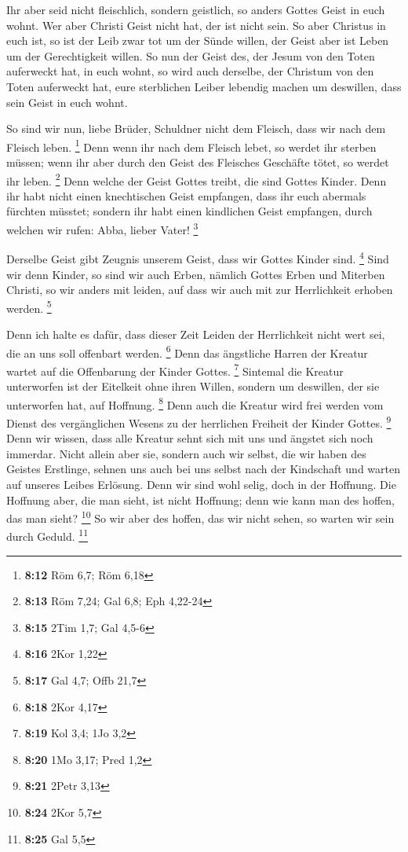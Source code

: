  Ihr aber seid nicht fleischlich, sondern geistlich, so
anders Gottes Geist in euch wohnt. Wer aber Christi Geist nicht hat, der
ist nicht sein.  So aber Christus in euch ist, so ist der
Leib zwar tot um der Sünde willen, der Geist aber ist Leben um der
Gerechtigkeit willen.  So nun der Geist des, der Jesum
von den Toten auferweckt hat, in euch wohnt, so wird auch derselbe, der
Christum von den Toten auferweckt hat, eure sterblichen Leiber lebendig
machen um deswillen, dass sein Geist in euch wohnt.

 So sind wir nun, liebe Brüder, Schuldner nicht dem
Fleisch, dass wir nach dem Fleisch leben. \footnote{\textbf{8:12} Röm
  6,7; Röm 6,18}  Denn wenn ihr nach dem Fleisch lebet,
so werdet ihr sterben müssen; wenn ihr aber durch den Geist des
Fleisches Geschäfte tötet, so werdet ihr leben. \footnote{\textbf{8:13}
  Röm 7,24; Gal 6,8; Eph 4,22-24}  Denn welche der Geist
Gottes treibt, die sind Gottes Kinder.  Denn ihr habt
nicht einen knechtischen Geist empfangen, dass ihr euch abermals
fürchten müsstet; sondern ihr habt einen kindlichen Geist empfangen,
durch welchen wir rufen: Abba, lieber Vater! \footnote{\textbf{8:15}
  2Tim 1,7; Gal 4,5-6}

 Derselbe Geist gibt Zeugnis unserem Geist, dass wir
Gottes Kinder sind. \footnote{\textbf{8:16} 2Kor 1,22} 
Sind wir denn Kinder, so sind wir auch Erben, nämlich Gottes Erben und
Miterben Christi, so wir anders mit leiden, auf dass wir auch mit zur
Herrlichkeit erhoben werden. \footnote{\textbf{8:17} Gal 4,7; Offb 21,7}

 Denn ich halte es dafür, dass dieser Zeit Leiden der
Herrlichkeit nicht wert sei, die an uns soll offenbart werden.
\footnote{\textbf{8:18} 2Kor 4,17}  Denn das ängstliche
Harren der Kreatur wartet auf die Offenbarung der Kinder Gottes.
\footnote{\textbf{8:19} Kol 3,4; 1Jo 3,2}  Sintemal die
Kreatur unterworfen ist der Eitelkeit ohne ihren Willen, sondern um
deswillen, der sie unterworfen hat, auf Hoffnung. \footnote{\textbf{8:20}
  1Mo 3,17; Pred 1,2}  Denn auch die Kreatur wird frei
werden vom Dienst des vergänglichen Wesens zu der herrlichen Freiheit
der Kinder Gottes. \footnote{\textbf{8:21} 2Petr 3,13} 
Denn wir wissen, dass alle Kreatur sehnt sich mit uns und ängstet sich
noch immerdar.  Nicht allein aber sie, sondern auch wir
selbst, die wir haben des Geistes Erstlinge, sehnen uns auch bei uns
selbst nach der Kindschaft und warten auf unseres Leibes Erlösung.
 Denn wir sind wohl selig, doch in der Hoffnung. Die
Hoffnung aber, die man sieht, ist nicht Hoffnung; denn wie kann man des
hoffen, das man sieht? \footnote{\textbf{8:24} 2Kor 5,7} 
So wir aber des hoffen, das wir nicht sehen, so warten wir sein durch
Geduld. \footnote{\textbf{8:25} Gal 5,5}

